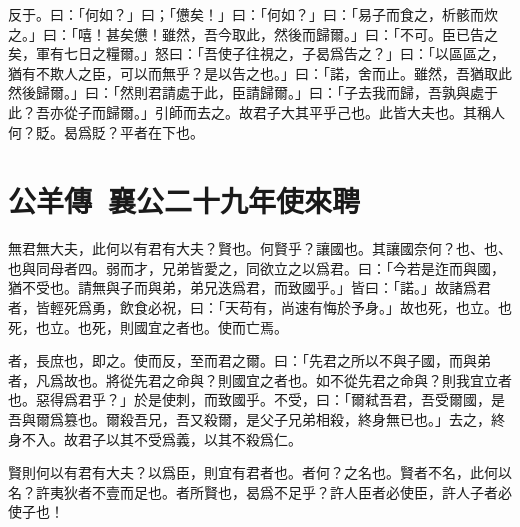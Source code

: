 反于。曰：「何如？」曰；「憊矣！」曰：「何如？」曰：「易子而食之，析骸而炊之。」曰：「嘻！甚矣憊！雖然，吾今取此，然後而歸爾。」曰：「不可。臣已告之矣，軍有七日之糧爾。」怒曰：「吾使子往視之，子曷爲告之？」曰：「以區區之，猶有不欺人之臣，可以而無乎？是以告之也。」曰：「諾，舍而止。雖然，吾猶取此然後歸爾。」曰：「然則君請處于此，臣請歸爾。」曰：「子去我而歸，吾孰與處于此？吾亦從子而歸爾。」引師而去之。故君子大其平乎己也。此皆大夫也。其稱人何？貶。曷爲貶？平者在下也。
\nopagebreak
\theendnotes

\section[吳子使季札來聘\quad{\small 公羊傳 襄公二十九年}]{{\normalsize 公羊傳\ 襄公二十九年}\quad {}使來聘}
無君無大夫，此何以有君有大夫？賢也。何賢乎？讓國也。其讓國奈何？也、也、也與同母者四。弱而才，兄弟皆愛之，同欲立之以爲君。曰：「今若是迮而與國，猶不受也。請無與子而與弟，弟兄迭爲君，而致國乎。」皆曰：「諾。」故諸爲君者，皆輕死爲勇，飲食必祝，曰：「天苟有，尚速有悔於予身。」故也死，也立。也死，也立。也死，則國宜之者也。使而亡焉。

者，長庶也，即之。使而反，至而君之爾。曰：「先君之所以不與子國，而與弟者，凡爲故也。將從先君之命與？則國宜之者也。如不從先君之命與？則我宜立者也。惡得爲君乎？」於是使刺，而致國乎。不受，曰：「爾弒吾君，吾受爾國，是吾與爾爲篡也。爾殺吾兄，吾又殺爾，是父子兄弟相殺，終身無已也。」去之，終身不入。故君子以其不受爲義，以其不殺爲仁。

賢則何以有君有大夫？以爲臣，則宜有君者也。者何？之名也。賢者不名，此何以名？許夷狄者不壹而足也。者所賢也，曷爲不足乎？許人臣者必使臣，許人子者必使子也！

